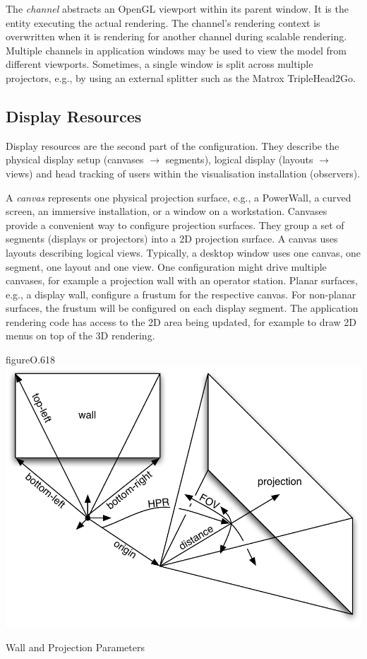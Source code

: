 The {\em channel} abstracts an OpenGL viewport within its parent
window. It is the entity executing the actual rendering. The channel's
rendering context is overwritten when it is rendering for another channel
during scalable rendering. Multiple channels in application windows may be used
to view the model from different viewports. Sometimes, a single window is split
across multiple projectors, e.g., by using an external splitter such as the
Matrox TripleHead2Go.


\subsection{Display Resources}

Display resources are the second part of the configuration. They describe the
physical display setup (canvases $\rightarrow$ segments), logical display
(layouts $\rightarrow$ views) and head tracking of users within the
visualisation installation (observers).

A {\em canvas} represents one physical projection surface, e.g., a
PowerWall, a curved screen, an immersive installation, or a window on a
workstation. Canvases provide a convenient way to configure projection
surfaces. They group a set of segments (displays or projectors) into a 2D
projection surface. A canvas uses layouts describing logical views.
Typically, a desktop window uses one canvas, one segment, one layout and one
view. One configuration might drive multiple canvases, for example a projection
wall with an operator station. Planar surfaces, e.g., a display wall, configure
a frustum for the respective canvas. For non-planar surfaces, the frustum will
be configured on each display segment. The application rendering code has
access to the 2D area being updated, for example to draw 2D menus on top of the
3D rendering.

\begin{wrapfloat}{figure}{O}{.618\textwidth}
 \includegraphics[width=.618\textwidth]{images/frusta.pdf}
 {\caption{\label{fFrusta}Wall and Projection Parameters}}
\end{wrapfloat}

